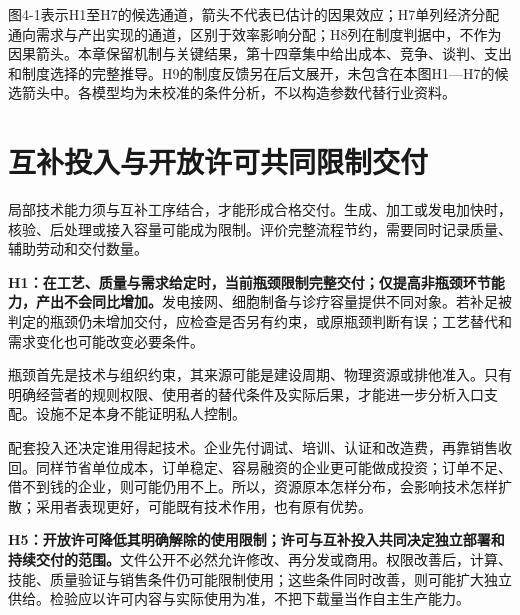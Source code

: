 \documentclass[UTF8,fontset=windows,12pt,a4paper,oneside,openany]{ctexbook}
\begin{document}
\begin{center}
{}\end{center}


图4-1表示H1至H7的候选通道，箭头不代表已估计的因果效应；H7单列经济分配通向需求与产出实现的通道，区别于效率影响分配；H8列在制度判据中，不作为因果箭头。本章保留机制与关键结果，第十四章集中给出成本、竞争、谈判、支出和制度选择的完整推导。H9的制度反馈另在后文展开，未包含在本图H1—H7的候选箭头中。各模型均为未校准的条件分析，不以构造参数代替行业资料。

\section{互补投入与开放许可共同限制交付}

局部技术能力须与互补工序结合，才能形成合格交付。生成、加工或发电加快时，核验、后处理或接入容量可能成为限制。评价完整流程节约，需要同时记录质量、辅助劳动和交付数量。

\textbf{H1：在工艺、质量与需求给定时，当前瓶颈限制完整交付；仅提高非瓶颈环节能力，产出不会同比增加。}发电接网、细胞制备与诊疗容量提供不同对象。若补足被判定的瓶颈仍未增加交付，应检查是否另有约束，或原瓶颈判断有误；工艺替代和需求变化也可能改变必要条件。

瓶颈首先是技术与组织约束，其来源可能是建设周期、物理资源或排他准入。只有明确经营者的规则权限、使用者的替代条件及实际后果，才能进一步分析入口支配。设施不足本身不能证明私人控制。

配套投入还决定谁用得起技术。企业先付调试、培训、认证和改造费，再靠销售收回。同样节省单位成本，订单稳定、容易融资的企业更可能做成投资；订单不足、借不到钱的企业，则可能仍用不上。所以，资源原本怎样分布，会影响技术怎样扩散；采用者表现更好，可能既有技术作用，也有原有优势。

\textbf{H5：开放许可降低其明确解除的使用限制；许可与互补投入共同决定独立部署和持续交付的范围。}文件公开不必然允许修改、再分发或商用。权限改善后，计算、技能、质量验证与销售条件仍可能限制使用；这些条件同时改善，则可能扩大独立供给。检验应以许可内容与实际使用为准，不把下载量当作自主生产能力。
\end{document}
